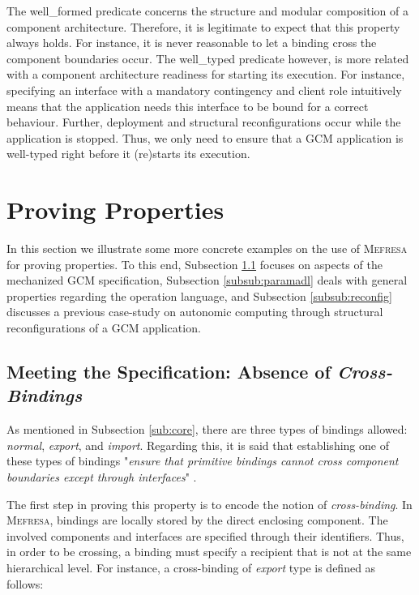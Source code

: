    		The \textsf{well\_formed} predicate concerns the structure and 
   	modular composition of a \textsf{component} architecture. Therefore, it is legitimate to expect that this property
   	always holds. For instance, it is never reasonable to let a \textsf{binding} cross the
	\textsf{component} boundaries occur. The \textsf{well\_typed} 
   	predicate however, is more related with a \textsf{component} architecture readiness 
   	for starting its execution. For instance, specifying an \textsf{interface} with a \textsf{mandatory} \textsf{contingency}
   	and \textsf{client} \textsf{role} intuitively means that the application needs this \textsf{interface} to be bound
   	for a correct behaviour. Further, deployment and structural reconfigurations occur while the application is
   	stopped. Thus, we only need to ensure that a \ac{GCM} application is well-typed right before it
   	(re)starts its execution.	


\section{Proving Properties}
\label{sec:ex}


		In this section we illustrate some more concrete examples on the use of \textsc{Mefresa}
	for proving properties. To this end, Subsection \ref{subsub:cross} focuses on aspects of the
 	mechanized \ac{GCM} specification, Subsection \ref{subsub:paramadl} deals with general properties
 	regarding the \textsf{operation} language, and Subsection \ref{subsub:reconfig} discusses
 	a previous case-study on autonomic computing through 
 	structural reconfigurations of a \ac{GCM} application.



\subsection{Meeting the Specification: Absence of \textit{Cross-Bindings}}
\label{subsub:cross}

	As mentioned in Subsection \ref{sub:core},  there are three types of \textsf{binding}s allowed:
	\textit{normal}, \textit{export}, and \textit{import}. Regarding this, it is said
	that establishing one of these types of \textsf{binding}s 
	"\textit{ensure that primitive bindings cannot cross component
boundaries except through interfaces}" \cite{fractalSpec}. 

The first step in proving this property is to encode the notion of
\textit{cross-binding}. In \textsc{Mefresa}, \textsf{binding}s are locally stored
by the direct enclosing \textsf{component}. The involved \textsf{component}s
and \textsf{interface}s are specified through their identifiers. Thus, in order to
be crossing, a \textsf{binding} must specify a recipient that is not at the same hierarchical level.
For instance, a cross-binding of
\textit{export} type is defined as follows:

